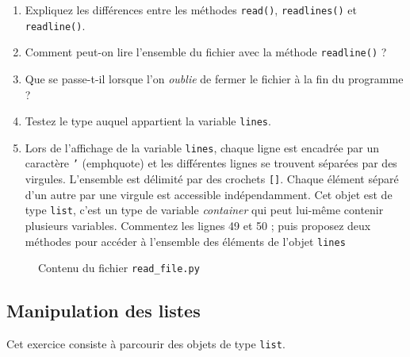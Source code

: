 \begin{enumerate}

\item Expliquez  les différences  entre les  méthodes \texttt{read()},
  \texttt{readlines()} et \texttt{readline()}.

\item  Comment peut-on lire  l'ensemble  du fichier  avec la  méthode
  \texttt{readline()} ?

\item  Que se  passe-t-il lorsque  l'on \textit{oublie}  de fermer  le
  fichier à la fin du programme ?

\item Testez le type auquel appartient la variable \texttt{lines}.

\item Lors de l'affichage de  la variable \texttt{lines}, chaque ligne
  est encadrée par un caractère \texttt{'} (emph{quote}) et les différentes
  lignes se trouvent
  séparées par des  virgules. L'ensemble est délimité  par des crochets
  \texttt{[]}.  Chaque  élément séparé d'un autre par une  virgule est accessible
  indépendamment.  Cet objet est de  type \texttt{list}, c'est un type
  de  variable \emph{container}  qui  peut  lui-même  contenir   plusieurs  variables.
  Commentez  les lignes  49 et  50 ; puis proposez  deux méthodes  pour
  accéder à l'ensemble des éléments de l'objet \texttt{lines}

\end{enumerate}


\begin{figure}  
  
  \caption{Contenu du fichier \texttt{read\_file.py}}
  \label{stat_read_file}
\end{figure}



\subsection{Manipulation des listes}
Cet exercice consiste à parcourir des objets de type \texttt{list}.

